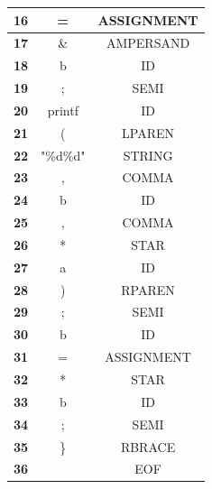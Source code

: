 \documentclass{article}
\begin{document}
\begin{latin}
\begin{longtable}[c]{|c|c|c|}
\textbf{16} & =                       & ASSIGNMENT    \\ \hline
\textbf{17} & \&                      & AMPERSAND     \\ \hline
\textbf{18} & b                       & ID            \\ \hline
\textbf{19} & ;                       & SEMI          \\ \hline
\textbf{20} & printf                  & ID            \\ \hline
\textbf{21} & (                       & LPAREN        \\ \hline
\textbf{22} & "\%d\%d"                & STRING        \\ \hline
\textbf{23} & ,                       & COMMA         \\ \hline
\textbf{24} & b                       & ID            \\ \hline
\textbf{25} & ,                       & COMMA         \\ \hline
\textbf{26} & *                       & STAR          \\ \hline
\textbf{27} & a                       & ID            \\ \hline
\textbf{28} & )                       & RPAREN        \\ \hline
\textbf{29} & ;                       & SEMI          \\ \hline
\textbf{30} & b                       & ID            \\ \hline
\textbf{31} & =                       & ASSIGNMENT    \\ \hline
\textbf{32} & *                       & STAR          \\ \hline
\textbf{33} & b                       & ID            \\ \hline
\textbf{34} & ;                       & SEMI          \\ \hline
\textbf{35} & \} & RBRACE      				  \\ \hline
\textbf{36} &                         & EOF           \\ \hline
\end{longtable}
\end{latin}
\end{document}
